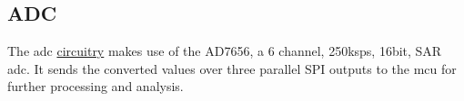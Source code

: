 \subsection{ADC}

The \gls{adc} \hyperlink{sch:adc}{circuitry} makes use of the AD7656, a 6 channel, 250ksps, 16bit, SAR \gls{adc}. It sends the converted values over three parallel SPI outputs to the \gls{mcu} for further processing and analysis. 

